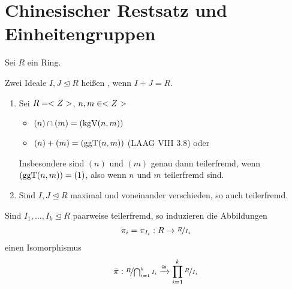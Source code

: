 \section{Chinesischer Restsatz und Einheitengruppen}

Sei $R$ ein Ring.

\begin{definition}[teilerfremd]
	Zwei Ideale $I,J \unlhd R$ heißen , wenn $I+J = R$.
\end{definition}

\begin{example}
	\begin{enumerate}[label=(\alph*)]
		\item Sei $R = <Z>$, $n,m \in <Z>$
			\begin{itemize}
				\item $(n) \cap (m) = (\operatorname{kgV}(n,m))$
				\item $(n) + (m) = (\operatorname{ggT}(n,m))$ (LAAG VIII 3.8) oder 
			\end{itemize}
		Insbesondere sind $(n)$ und $(m)$ genau dann teilerfremd, wenn $(\operatorname{ggT}(n,m)) = (1)$, also wenn $n$ und $m$ teilerfremd sind.
		\item Sind $I,J \unlhd R$ maximal und voneinander verschieden, so auch teilerfremd.
	\end{enumerate}
\end{example}

\begin{theorem}
	Sind $I_1, \dots , I_k \unlhd R$ paarweise teilerfremd, so induzieren die Abbildungen
	\begin{align}
		\pi_i = \pi_{I_i} : R \to \nicefrac{R}{I_i}\notag
	\end{align}
	einen Isomorphismus
	\begin{align}
		\bar{\pi}: \nicefrac{R}{\bigcap_{i=1}^{k} I_i} \xrightarrow{\cong} \prod_{i=1}^{k} \nicefrac{R}{I_i} \notag
	\end{align}
\end{theorem}

